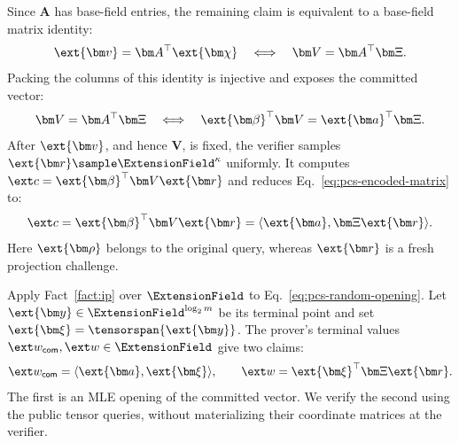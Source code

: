 Since \(\bm A\) has base-field entries, the remaining claim is
equivalent to a base-field matrix identity:
\begin{equation*}
    \ext{\bm v}=\bm A^\top\ext{\bm\chi}
    \quad\Longleftrightarrow\quad
    \bm V=\bm A^\top\bm\Xi.
\end{equation*}
Packing the columns of this identity is injective and exposes the
committed vector:
\begin{equation}
    \bm V=\bm A^\top\bm\Xi
    \quad\Longleftrightarrow\quad
    \ext{\bm\beta}^{\top}\bm V
    =\ext{\bm a}^{\top}\bm\Xi.
\label{eq:pcs-encoded-matrix}
\end{equation}
After \(\ext{\bm v}\), and hence \(\bm V\), is fixed, the verifier
samples \(\ext{\bm r}\sample\ExtensionField^\kappa\) uniformly.
It computes \(\ext c=\ext{\bm\beta}^{\top}\bm V\ext{\bm r}\)
and reduces Eq.~\eqref{eq:pcs-encoded-matrix} to:
\begin{equation}
    \ext c
    =\ext{\bm\beta}^{\top}\bm V\ext{\bm r}
    =\langle\ext{\bm a},\bm\Xi\ext{\bm r}\rangle.
\label{eq:pcs-random-opening}
\end{equation}
Here \(\ext{\bm\rho}\) belongs to the original query, whereas
\(\ext{\bm r}\) is a fresh projection challenge.

Apply Fact~\ref{fact:ip} over \(\ExtensionField\) to
Eq.~\eqref{eq:pcs-random-opening}.
Let \(\ext{\bm y}\in\ExtensionField^{\log_2m}\) be its terminal
point and set
\(\ext{\bm\xi}=\tensorspan{\ext{\bm y}}\).
The prover's terminal values
\(\ext w_{\mathsf{com}},\ext w\in\ExtensionField\) give two claims:
\begin{equation}
    \ext w_{\mathsf{com}}
    =\langle\ext{\bm a},\ext{\bm\xi}\rangle,
    \qquad
    \ext w=\ext{\bm\xi}^{\top}\bm\Xi\ext{\bm r}.
\label{eq:pcs-terminal-claims}
\end{equation}
The first is an MLE opening of the committed vector.
We verify the second using the public tensor queries, without
materializing their coordinate matrices at the verifier.

